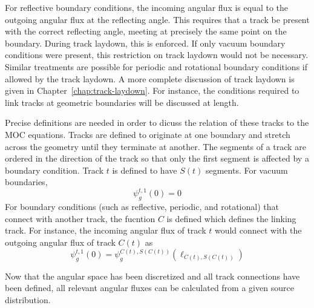 For reflective boundary conditions, the incoming angular flux is equal to the outgoing angular flux at the reflecting angle. This requires that a track be present with the correct reflecting angle, meeting at precisely the same point on the boundary. During track laydown, this is enforced. If only vacuum boundary conditions were present, this restriction on track laydown would not be necessary. Similar treatments are possible for periodic and rotational boundary conditions if allowed by the track laydown.  A more complete discussion of track laydown is given in Chapter~\ref{chap:track-laydown}. For instance, the conditions required to link tracks at geometric boundaries will be discussed at length.

Precise definitions are needed in order to dicuss the relation of these tracks to the MOC equations. Tracks are defined to originate at one boundary and stretch across the geometry until they terminate at another. The segments of a track are ordered in the direction of the track so that only the first segment is affected by a boundary condition. Track $t$ is defined to have $S(t)$ segments. For vacuum boundaries,
\begin{dmath}
	\psi_g^{t,1}(0) = 0
\end{dmath}
For boundary conditions (such as reflective, periodic, and rotational) that connect with another track, the fucntion $C$ is defined which defines the linking track. For instance, the incoming angular flux of track $t$ would connect with the outgoing angular flux of track $C(t)$ as
\begin{dmath}
	\psi_g^{t,1}(0) = \psi_g^{C(t),S(C(t))}(\ell_{C(t),S(C(t))})
	\label{eqn:linking-bc}
\end{dmath}

Now that the angular space has been discretized and all track connections have been defined, all relevant angular fluxes can be calculated from a given source distribution.

